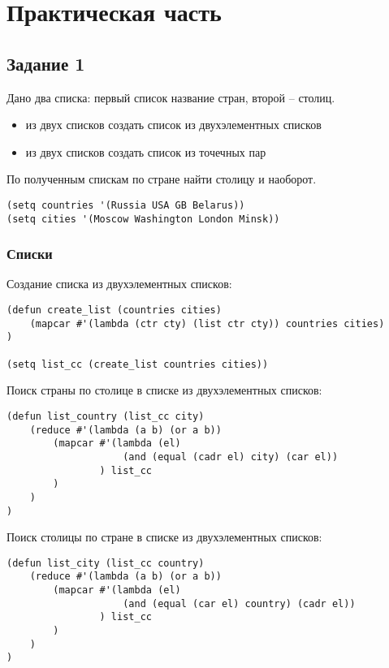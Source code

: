 \chapter{Практическая часть}

\section{Задание \No{}1}

Дано два списка: первый список название стран, второй -- столиц.

\begin{itemize}
    \item из двух списков создать список из двухэлементных списков
    \item из двух списков создать список из точечных пар
\end{itemize}

По полученным спискам по стране найти столицу и наоборот.


\begin{lstlisting}
(setq countries '(Russia USA GB Belarus))
(setq cities '(Moscow Washington London Minsk))
\end{lstlisting}

\subsection{Списки}

Создание списка из двухэлементных списков:
\begin{lstlisting}
(defun create_list (countries cities)
    (mapcar #'(lambda (ctr cty) (list ctr cty)) countries cities)
)

(setq list_cc (create_list countries cities))
\end{lstlisting}

Поиск страны по столице в списке из двухэлементных списков:
\begin{lstlisting}
(defun list_country (list_cc city)
    (reduce #'(lambda (a b) (or a b))
        (mapcar #'(lambda (el)
                    (and (equal (cadr el) city) (car el))
                ) list_cc
        )
    )
)
\end{lstlisting}

Поиск столицы по стране в списке из двухэлементных списков:
\begin{lstlisting}
(defun list_city (list_cc country)
    (reduce #'(lambda (a b) (or a b))
        (mapcar #'(lambda (el)
                    (and (equal (car el) country) (cadr el))
                ) list_cc
        )
    )
)
\end{lstlisting}

